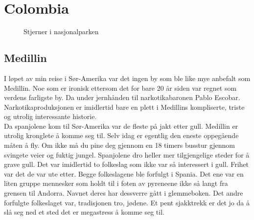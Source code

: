 \clearpage
\section*{Colombia}

\begin{figure}[!h]
	\centering
\noindent{}
	\caption*{Stjerner i nasjonalparken}
\label{fig:colombia}
\end{figure}

\subsection*{Medillin}
I løpet av min reise i Sør-Amerika var det ingen by som ble like mye
anbefalt som Medillin. Noe som er ironisk ettersom det for bare 20 år
siden var regnet som verdens farligste by. Da under jernhånden til
narkotikabaronen Pablo Escobar. Narkotikaproduksjonen er imidlertid
bare en plett i Medillins kompliserte, triste og utrolig interessante
historie.  \\

Da spanjolene kom til Sør-Amerika var de fleste på jakt etter gull.
Medillin er utrolig kronglete å komme seg til. Selv idag er egentlig
den eneste oppegående måten å fly. Om ikke må du
pine deg gjennom en 18 timers busstur gjennom svingete veier og fuktig
jungel. Spanjolene dro heller mer tilgjengelige steder for å grave
gull. Det var imidlertid to folkeslag som ikke var så interessert i
gull. Frihet var det de var ute etter. Begge folkeslagene ble
forfulgt i Spania. Det ene var en liten gruppe mennesker som holdt
til i foten av pyreneene ikke så langt fra grensen til Andorra. Navnet deres har dessverre gått i
glemmeboken. Det andre forfulgte folkeslaget var, tradisjonen tro,
jødene. Et pent sjakktrekk er det jo da å slå seg ned et sted det er
megastress å komme seg
til.\\

